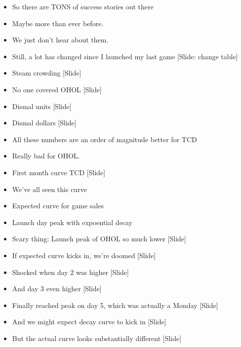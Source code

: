 \documentclass[12pt]{article}
\begin{document}
{\begin{itemize}
\item So there are TONS of success stories out there

\item Maybe more than ever before.

\item We just don't hear about them.

\item Still, a lot has changed since I launched my last game [Slide: change table]

\item Steam crowding [Slide]

\item No one covered OHOL [Slide]

\item Dismal units [Slide]

\item Dismal dollars [Slide]

\item All these numbers are an order of magnitude better for TCD

\item Really bad for OHOL.

\item First month curve TCD [Slide]

\item We've all seen this curve

\item Expected curve for game sales

\item Launch day peak with expoential decay

\item Scary thing:  Launch peak of OHOL so much lower [Slide]

\item If expected curve kicks in, we're doomed [Slide]

\item Shocked when day 2 was higher [Slide]

\item And day 3 even higher [Slide]

\item Finally reached peak on day 5, which was actually a Monday [Slide]

\item And we might expect decay curve to kick in [Slide]

\item But the actual curve looks substantially different [Slide]


\end{itemize}}
\end{document}
